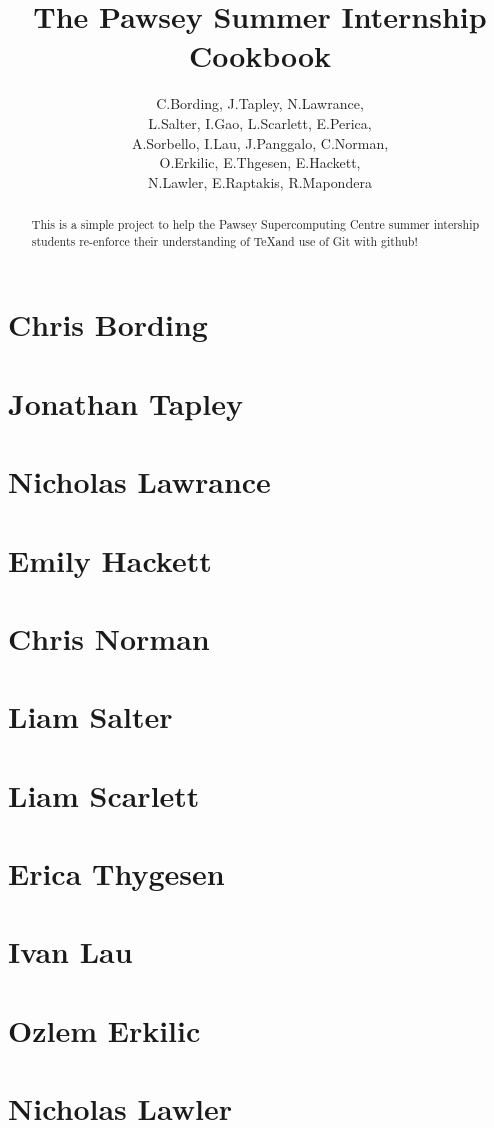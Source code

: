 \documentclass[11pt,a4paper]{report}
\title{The Pawsey Summer Internship Cookbook}
\author{C.Bording, J.Tapley, N.Lawrance,\\
L.Salter, I.Gao, L.Scarlett, E.Perica,\\
A.Sorbello, I.Lau, J.Panggalo, C.Norman,\\
O.Erkilic, E.Thgesen, E.Hackett,\\
N.Lawler, E.Raptakis, R.Mapondera}
\begin{document}
\maketitle
\tableofcontents


\begin{abstract}

This is a simple project to help the Pawsey Supercomputing Centre summer intership students re-enforce their understanding of \TeX and use of Git with github!

\end{abstract}

\chapter{Chris Bording}



\chapter{Jonathan Tapley}


\chapter{Nicholas Lawrance}


\chapter{Emily Hackett}


\chapter{Chris Norman}

\chapter{Liam Salter}


\chapter{Liam Scarlett}


\chapter{Erica Thygesen}


\chapter{Ivan Lau}


\chapter{Ozlem Erkilic}


\chapter{Nicholas Lawler}

\end{document}
